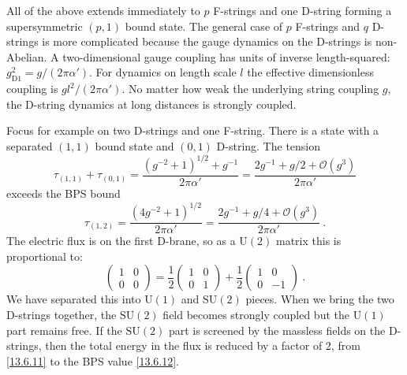 All of the above extends immediately to $p$ F-strings and one D-string forming a supersymmetric $(p,1)$ bound state. The general case of $p$ F-strings and $q$ D-strings is more complicated because the gauge dynamics on the D-strings is non-Abelian. A two-dimensional gauge coupling has units of inverse length-squared: $g_{\mathrm{D}1}^2 = g/(2\pi\alpha')$. For dynamics on length scale $l$ the effective dimensionless coupling is $g l^2/(2\pi\alpha')$. No matter how weak the underlying string coupling $g$, the D-string dynamics at long distances is strongly coupled.

Focus for example on two D-strings and one F-string. There is a state with a separated $(1,1)$ bound state and $(0,1)$ D-string. The tension
\begin{equation}
	\tau_{(1,1)} + \tau_{(0,1)} = \frac{(g^{-2} + 1)^{1/2} + g^{-1}}{2\pi\alpha'} = \frac{2g^{-1} + g/2 + \mathcal{O}(g^3)}{2\pi\alpha'} \label{13.6.11}
\end{equation}
exceeds the BPS bound
\begin{equation}
	\tau_{(1,2)} = \frac{(4g^{-2} + 1)^{1/2}}{2\pi\alpha'} = \frac{2g^{-1} + g/4 + \mathcal{O}(g^3)}{2\pi\alpha'} \:. \label{13.6.12}
\end{equation}
The electric flux is on the first D-brane, so as a $\mathrm{U}(2)$ matrix this is proportional to:
\begin{equation}
	\begin{pmatrix} 1 & 0 \\ 0 & 0 \end{pmatrix} = \frac{1}{2}\begin{pmatrix} 1 & 0 \\ 0 & 1 \end{pmatrix} + \frac{1}{2}\begin{pmatrix} 1 & 0 \\ 0 & -1 \end{pmatrix} \:. \label{13.6.13}
\end{equation}
We have separated this into $\mathrm{U}(1)$ and $\mathrm{SU}(2)$ pieces. When we bring the two D-strings together, the $\mathrm{SU}(2)$ field becomes strongly coupled but the $\mathrm{U}(1)$ part remains free. If the $\mathrm{SU}(2)$ part is screened by the massless fields on the D-strings, then the total energy in the flux is reduced by a factor of 2, from \eqref{13.6.11} to the BPS value \eqref{13.6.12}.
